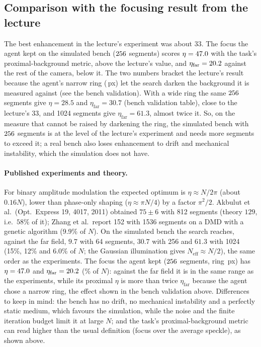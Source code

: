 \documentclass[11pt,a4paper]{article}
\begin{document}
\subsection*{Comparison with the focusing result from the lecture}
\newcommand{\lecturebest}{33}
The best enhancement in the lecture's experiment was about $\lecturebest$. The focus the agent kept on the simulated bench
($256$ segments) scores $\eta=47.0$ with the task's proximal-background metric, above the lecture's value, and
$\eta_\text{far}=20.2$ against the rest of the camera, below it. The two numbers bracket the lecture's result because the
agent's narrow ring (\agentring\,px) let the search darken the background it is measured against (see the bench validation).
With a wide ring the same $256$ segments give $\eta=28.5$ and $\eta_\text{far}=30.7$ (bench validation table),
close to the lecture's $\lecturebest$, and 1024 segments give $\eta_\text{far}=61.3$, almost twice it. So, on the measure that
cannot be raised by darkening the ring, the simulated bench with $256$ segments is at the level of the lecture's
experiment and needs more segments to exceed it; a real bench also loses enhancement to drift and mechanical instability,
which the simulation does not have.

\paragraph{Published experiments and theory.}
For binary amplitude modulation the expected optimum is $\eta\approx N/2\pi$ (about $0.16N$), lower than phase-only shaping
($\eta\approx\pi N/4$) by a factor $\pi^2/2$. Akbulut et al.\ (Opt.\ Express 19, 4017, 2011) obtained $75\pm6$ with 812 segments
(theory $129$, i.e.\ $58\%$ of it); Zhang et al.\ report 152 with 1536 segments on a DMD with a genetic algorithm (9.9\% of $N$).
On the simulated bench the search reaches, against the far field, $9.7$ with 64 segments, $30.7$ with 256 and $61.3$ with 1024
(15\%, 12\% and 6.0\% of $N$; the Gaussian illumination gives $N_\text{eff}\approx N/2$), the same order as the experiments.
The focus the agent kept ($256$ segments, ring \agentring\,px) has $\eta=47.0$ and
$\eta_\text{far}=20.2$ (\agentfarpct\% of $N$): against the far field it is in the same range as the experiments,
while its proximal $\eta$ is more than twice $\eta_\text{far}$ because the agent chose a narrow ring, the effect shown in the
bench validation above.
Differences to keep in mind: the bench has no drift, no mechanical instability and a perfectly static medium, which favours the
simulation, while the noise and the finite iteration budget limit it at large $N$; and the task's proximal-background metric can
read higher than the usual definition (focus over the average speckle), as shown above.
\end{document}
